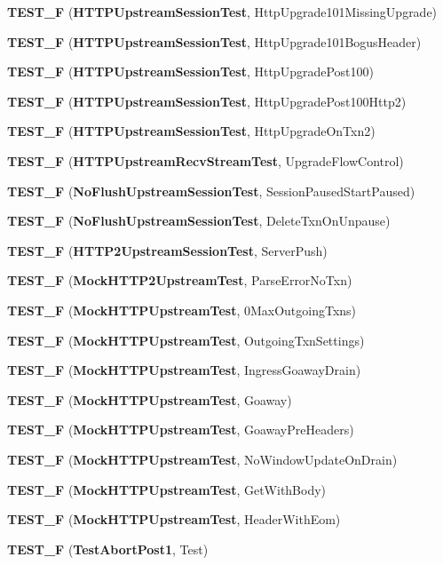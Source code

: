 \begin{DoxyCompactItemize}
\item 
{\bf T\+E\+S\+T\+\_\+F} ({\bf H\+T\+T\+P\+Upstream\+Session\+Test}, Http\+Upgrade101\+Missing\+Upgrade)
\item 
{\bf T\+E\+S\+T\+\_\+F} ({\bf H\+T\+T\+P\+Upstream\+Session\+Test}, Http\+Upgrade101\+Bogus\+Header)
\item 
{\bf T\+E\+S\+T\+\_\+F} ({\bf H\+T\+T\+P\+Upstream\+Session\+Test}, Http\+Upgrade\+Post100)
\item 
{\bf T\+E\+S\+T\+\_\+F} ({\bf H\+T\+T\+P\+Upstream\+Session\+Test}, Http\+Upgrade\+Post100\+Http2)
\item 
{\bf T\+E\+S\+T\+\_\+F} ({\bf H\+T\+T\+P\+Upstream\+Session\+Test}, Http\+Upgrade\+On\+Txn2)
\item 
{\bf T\+E\+S\+T\+\_\+F} ({\bf H\+T\+T\+P\+Upstream\+Recv\+Stream\+Test}, Upgrade\+Flow\+Control)
\item 
{\bf T\+E\+S\+T\+\_\+F} ({\bf No\+Flush\+Upstream\+Session\+Test}, Session\+Paused\+Start\+Paused)
\item 
{\bf T\+E\+S\+T\+\_\+F} ({\bf No\+Flush\+Upstream\+Session\+Test}, Delete\+Txn\+On\+Unpause)
\item 
{\bf T\+E\+S\+T\+\_\+F} ({\bf H\+T\+T\+P2\+Upstream\+Session\+Test}, Server\+Push)
\item 
{\bf T\+E\+S\+T\+\_\+F} ({\bf Mock\+H\+T\+T\+P2\+Upstream\+Test}, Parse\+Error\+No\+Txn)
\item 
{\bf T\+E\+S\+T\+\_\+F} ({\bf Mock\+H\+T\+T\+P\+Upstream\+Test}, 0\+Max\+Outgoing\+Txns)
\item 
{\bf T\+E\+S\+T\+\_\+F} ({\bf Mock\+H\+T\+T\+P\+Upstream\+Test}, Outgoing\+Txn\+Settings)
\item 
{\bf T\+E\+S\+T\+\_\+F} ({\bf Mock\+H\+T\+T\+P\+Upstream\+Test}, Ingress\+Goaway\+Drain)
\item 
{\bf T\+E\+S\+T\+\_\+F} ({\bf Mock\+H\+T\+T\+P\+Upstream\+Test}, Goaway)
\item 
{\bf T\+E\+S\+T\+\_\+F} ({\bf Mock\+H\+T\+T\+P\+Upstream\+Test}, Goaway\+Pre\+Headers)
\item 
{\bf T\+E\+S\+T\+\_\+F} ({\bf Mock\+H\+T\+T\+P\+Upstream\+Test}, No\+Window\+Update\+On\+Drain)
\item 
{\bf T\+E\+S\+T\+\_\+F} ({\bf Mock\+H\+T\+T\+P\+Upstream\+Test}, Get\+With\+Body)
\item 
{\bf T\+E\+S\+T\+\_\+F} ({\bf Mock\+H\+T\+T\+P\+Upstream\+Test}, Header\+With\+Eom)
\item 
{\bf T\+E\+S\+T\+\_\+F} ({\bf Test\+Abort\+Post1}, Test)
\item 

\end{DoxyCompactItemize}
